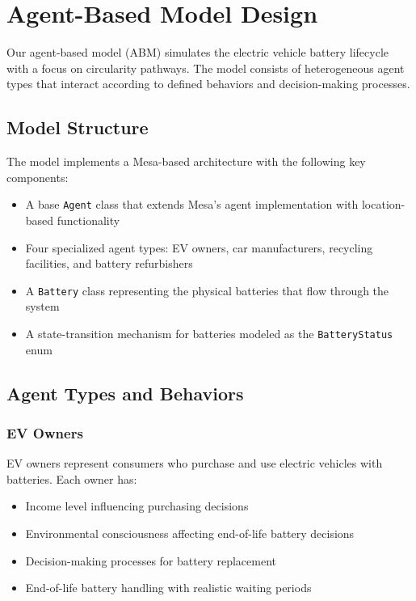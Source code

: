 \section{Agent-Based Model Design}

Our agent-based model (ABM) simulates the electric vehicle battery lifecycle with a focus on circularity pathways. The model consists of heterogeneous agent types that interact according to defined behaviors and decision-making processes.

\subsection{Model Structure}
The model implements a Mesa-based architecture with the following key components:
\begin{itemize}
    \item A base \texttt{Agent} class that extends Mesa's agent implementation with location-based functionality
    \item Four specialized agent types: EV owners, car manufacturers, recycling facilities, and battery refurbishers
    \item A \texttt{Battery} class representing the physical batteries that flow through the system
    \item A state-transition mechanism for batteries modeled as the \texttt{BatteryStatus} enum
\end{itemize}

\subsection{Agent Types and Behaviors}

\subsubsection{EV Owners}
EV owners represent consumers who purchase and use electric vehicles with batteries. Each owner has:
\begin{itemize}
    \item Income level influencing purchasing decisions
    \item Environmental consciousness affecting end-of-life battery decisions
    \item Decision-making processes for battery replacement
    \item End-of-life battery handling with realistic waiting periods
\end{itemize}

